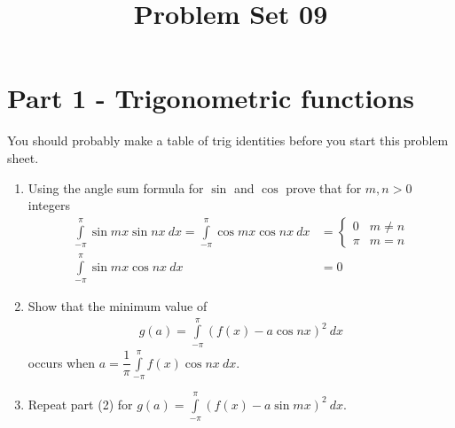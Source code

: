 \documentclass[9pt, a4paper, oneside, reqno]{amsart}
\title{Problem Set 09}
\begin{document}
\maketitle
\thispagestyle{fancy}


\section*{Part 1 - Trigonometric functions}
You should probably make a table of trig identities before you start this problem sheet.
\begin{questions}


	\item
	\begin{enumerate}
		\item Using the angle sum formula for $ \sin$ and $ \cos$ prove that for $ m, n > 0$  integers
		      \begin{align*}
		      	\int \limits _ {-\pi}^\pi  \sin mx \sin nx \: dx
		      	=
		      	\int \limits _ {-\pi}^\pi  \cos mx \cos nx \:dx
		      	& =
		      	\begin{cases} 0 & m \neq n \\ \pi & m = n\end{cases} \\
		      	\int \limits _ {-\pi}^\pi  \sin mx \cos nx \:dx
		      	& = 0
		      \end{align*}
		\item Show that the minimum value of \begin{align*}
		      g(a) = \int \limits _ {-\pi}^\pi  (f(x) - a \cos nx)^2\: dx
		\end{align*}
		occurs when $ a = \dfrac{1}{\pi}\int \limits _ {-\pi}^\pi  f(x) \cos nx\: dx$.
		\item Repeat part (2) for $g(a) = \int \limits _ {-\pi}^\pi  (f(x) - a \sin mx)^2 \: dx$.
	\end{enumerate}


\end{questions}
\end{document}
